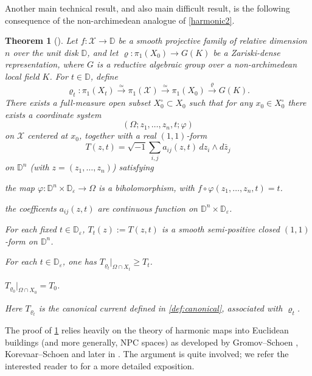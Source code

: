 \documentclass[english]{amsproc}
\theoremstyle{plain}
\newtheorem{thm}{Theorem}[section]
\theoremstyle{definition}
\theoremstyle{remark}
\theoremstyle{plain}
\numberwithin{equation}{thm} %
\def\ep{\varepsilon}
\newcommand{\sX}{\mathscr{X}}
\newcommand{\bD}{\mathbb{D}}
\begin{document}
	Another main technical result, and also main difficult result, is the following consequence of  the non-archimedean analogue of \cref{harmonic2}. 
	\begin{thm}[{\cite[Lemma 5.2]{DMW24}}]\label{lem:continuity}
	Let $f:\sX\to \bD$ be a smooth projective family of relative dimension $n$
	over the unit disk $\bD$, and let
	$\varrho:\pi_1(X_0)\to G(K)$ be a Zariski-dense representation,
	where $G$ is a reductive algebraic group over a non-archimedean local field $K$.
	For $t\in\bD$, define
	\begin{equation}\label{eq:t2}
	 \varrho_t:\pi_1(X_t)\stackrel{\simeq}{\to}\pi_1(\sX)\stackrel{\simeq}{\to}\pi_1(X_0)
		\stackrel{\varrho}{\longrightarrow} G(K).
	\end{equation}
	There exists a full-measure open subset $X_0^\circ\subset X_0$ such that
	for any $x_0\in X_0^\circ$ there exists a coordinate system
	\[
	(\Omega; z_1,\ldots,z_n,t;\varphi)
	\]
	on $\sX$ centered at $x_0$, together with a real $(1,1)$-form
	\[
	T(z,t)=\sqrt{-1}\sum_{i,j} a_{ij}(z,t)\,dz_i\wedge d\bar z_j
	\]
	on $\bD^n$ (with $z=(z_1,\ldots,z_n)$) satisfying
		\begin{thmlist}
			\item the map $\varphi:\bD^n\times \bD_\ep\to \Omega$ is a biholomorphism, with $f\circ \varphi(z_1,\ldots,z_n,t)=t$.  
			\item the coefficents $a_{ij}(z,t)$ are continuous function on $\bD^n\times\bD_{\ep}$.
			\item For each fixed $t\in \bD_\ep$, $T_{t}(z):=T(z,t)$ is a smooth semi-positive closed $(1,1)$-form on $\bD^n$.
			\item For each $t\in \bD_\ep$, one has  $ T_{\varrho_t}|_{\Omega\cap X_t}\geq T_t$.
			\item  $T_{\varrho_{0}}|_{\Omega\cap X_0}=T_0$.
		\end{thmlist} 
		Here $T_{\varrho_t}$ is the canonical current 
		defined in \cref{def:canonical}, associated with  $\varrho_t$. 
 	\end{thm}
 	 	The proof of \cref{lem:continuity} relies heavily on the theory of harmonic
 	maps into Euclidean buildings (and more generally, NPC spaces) as developed by Gromov--Schoen \cite{GS92}, 
 	Korevaar--Schoen \cite{KS,KS2} and later in \cite{BDDM}. The argument is quite involved; we refer
 	the interested reader to \cite{DMW24} for a more detailed exposition.
 	
\end{document}
